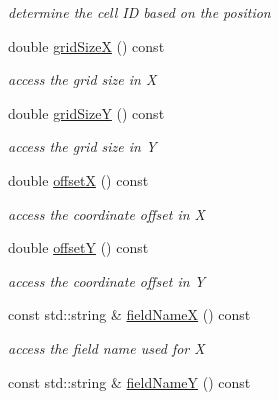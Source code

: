 \begin{DoxyCompactItemize}
\begin{DoxyCompactList}\small\item\em determine the cell ID based on the position \item\end{DoxyCompactList}\item 
double \hyperlink{class_d_d4hep_1_1_d_d_segmentation_1_1_cartesian_grid_x_y_afe3cadfcc4e9e34f0e9ce3249b27a81d}{gridSizeX} () const 
\begin{DoxyCompactList}\small\item\em access the grid size in X \item\end{DoxyCompactList}\item 
double \hyperlink{class_d_d4hep_1_1_d_d_segmentation_1_1_cartesian_grid_x_y_aba05b046286981c8aec7d8d4bb39838e}{gridSizeY} () const 
\begin{DoxyCompactList}\small\item\em access the grid size in Y \item\end{DoxyCompactList}\item 
double \hyperlink{class_d_d4hep_1_1_d_d_segmentation_1_1_cartesian_grid_x_y_a53dd6d89c5818f455e9a6a284ada776e}{offsetX} () const 
\begin{DoxyCompactList}\small\item\em access the coordinate offset in X \item\end{DoxyCompactList}\item 
double \hyperlink{class_d_d4hep_1_1_d_d_segmentation_1_1_cartesian_grid_x_y_a8bbdc7e225db516f1d7f931042e20fc6}{offsetY} () const 
\begin{DoxyCompactList}\small\item\em access the coordinate offset in Y \item\end{DoxyCompactList}\item 
const std::string \& \hyperlink{class_d_d4hep_1_1_d_d_segmentation_1_1_cartesian_grid_x_y_aeeb4c3dc46456163440cd44b620b7401}{fieldNameX} () const 
\begin{DoxyCompactList}\small\item\em access the field name used for X \item\end{DoxyCompactList}\item 
const std::string \& \hyperlink{class_d_d4hep_1_1_d_d_segmentation_1_1_cartesian_grid_x_y_afb4f3202e5bff1c535f5a97051decb83}{fieldNameY} () const 

\end{DoxyCompactItemize}
